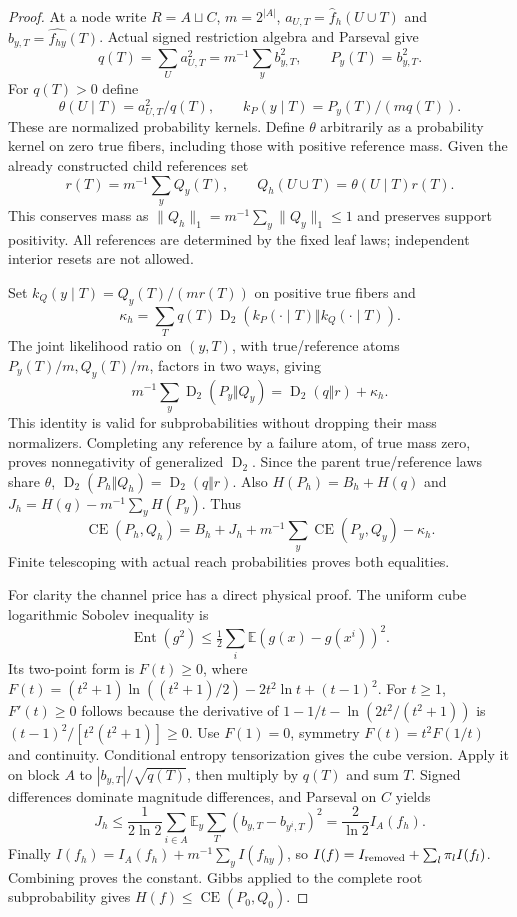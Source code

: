 \documentclass[11pt]{article}
\newcommand{\CE}{\operatorname{CE}}
\newcommand{\KL}{\operatorname{D}_2}
\begin{document}
\begin{proof}
At a node write $R=A\sqcup C$, $m=2^{|A|}$,
$a_{U,T}=\widehat f_h(U\cup T)$ and
$b_{y,T}=\widehat{f_{hy}}(T)$. Actual signed restriction algebra and Parseval give
\[
q(T)=\sum_U a_{U,T}^2=m^{-1}\sum_y b_{y,T}^2,
\qquad P_y(T)=b_{y,T}^2.
\]
For $q(T)>0$ define
\[
\theta(U\mid T)=a_{U,T}^2/q(T),\qquad
k_P(y\mid T)=P_y(T)/(mq(T)).
\]
These are normalized probability kernels. Define $\theta$ arbitrarily as
a probability kernel on zero true fibers, including those with positive
reference mass. Given the already constructed child references set
\[
r(T)=m^{-1}\sum_yQ_y(T),\qquad
Q_h(U\cup T)=\theta(U\mid T)r(T).
\]
This conserves mass as $\|Q_h\|_1=m^{-1}\sum_y\|Q_y\|_1\le1$ and preserves
support positivity. All references are determined by the fixed leaf laws;
independent interior resets are not allowed.

Set $k_Q(y\mid T)=Q_y(T)/(mr(T))$ on positive true fibers and
\[
\kappa_h=\sum_Tq(T)\KL(k_P(\cdot\mid T)\Vert k_Q(\cdot\mid T)).
\]
The joint likelihood ratio on $(y,T)$, with true/reference atoms
$P_y(T)/m,Q_y(T)/m$, factors in two ways, giving
\[
m^{-1}\sum_y\KL(P_y\Vert Q_y)=\KL(q\Vert r)+\kappa_h.
\]
This identity is valid for subprobabilities without dropping their mass
normalizers. Completing any reference by a failure atom, of true mass zero,
proves nonnegativity of generalized $\KL$. Since the parent true/reference
laws share $\theta$, $\KL(P_h\Vert Q_h)=\KL(q\Vert r)$. Also
$H(P_h)=B_h+H(q)$ and $J_h=H(q)-m^{-1}\sum_yH(P_y)$. Thus
\[
\CE(P_h,Q_h)=B_h+J_h+m^{-1}\sum_y\CE(P_y,Q_y)-\kappa_h.
\]
Finite telescoping with actual reach probabilities proves both equalities.

For clarity the channel price has a direct physical proof. The uniform
cube logarithmic Sobolev inequality is
\[
\operatorname{Ent}(g^2)\le\tfrac12\sum_i\mathbb E(g(x)-g(x^i))^2.
\]
Its two-point form is $F(t)\ge0$, where
$F(t)=(t^2+1)\ln((t^2+1)/2)-2t^2\ln t+(t-1)^2$.
For $t\ge1$, $F'(t)\ge0$ follows because the derivative of
$1-1/t-\ln(2t^2/(t^2+1))$ is
$(t-1)^2/[t^2(t^2+1)]\ge0$. Use $F(1)=0$, symmetry
$F(t)=t^2F(1/t)$ and continuity. Conditional entropy tensorization gives
the cube version. Apply it on block $A$ to
$|b_{y,T}|/\sqrt{q(T)}$, then multiply by $q(T)$ and sum $T$.
Signed differences dominate magnitude differences, and Parseval on $C$ yields
\[
J_h\le\frac1{2\ln2}\sum_{i\in A}\mathbb E_y\sum_T
(b_{y,T}-b_{y^i,T})^2=\frac2{\ln2}I_A(f_h).
\]
Finally $I(f_h)=I_A(f_h)+m^{-1}\sum_y I(f_{hy})$, so
$I(f)=I_{\rm removed}+\sum_l\pi_l I(f_l)$. Combining proves the constant.
Gibbs applied to the complete root subprobability gives $H(f)\le\CE(P_0,Q_0)$.
\end{proof}
\end{document}
